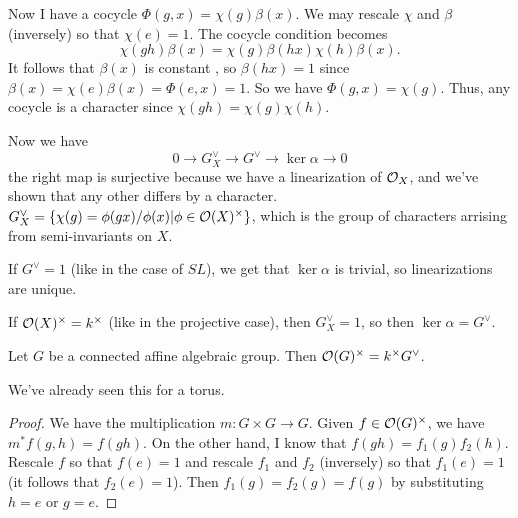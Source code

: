 Now I have a cocycle $\Phi(g,x)=\chi(g)\beta(x)$. We may rescale $\chi$ and $\beta$ (inversely) so that $\chi(e)=1$. The cocycle condition becomes
\[
 \chi(gh)\beta(x)=\chi(g)\beta(hx)\chi(h)\beta(x).
\]
It follows that $\beta(x)$ is constant , so $\beta(hx)=1$ since $\beta(x)=\chi(e)\beta(x)=\Phi(e,x)=1$. So we have $\Phi(g,x)=\chi(g)$. Thus, any cocycle is a character since $\chi(gh)=\chi(g)\chi(h)$.

Now we have
\[
 0\to G_X^\vee\to G^\vee\to \ker \alpha \to 0
\]
the right map is surjective because we have a linearization of $\mathcal{O}_X$, and we've shown that any other differs by a character. $G_X^\vee = \{\chi(g) = \phi(gx)/\phi(x)|\phi\in \mathcal{O}(X)^\times\}$, which is the group of characters arrising from semi-invariants on $X$.
\begin{example}
 If $G^\vee =1$ (like in the case of $SL$), we get that $\ker \alpha$ is trivial, so linearizations are unique.
 
 If $\mathcal{O}(X)^\times =k^\times$ (like in the projective case), then $G_X^\vee=1$, so then $\ker \alpha=G^\vee$.
\end{example}
\begin{theorem}
 Let $G$ be a connected affine algebraic group. Then $\mathcal{O}(G)^\times = k^\times G^\vee$.
\end{theorem}
We've already seen this for a torus.
\begin{proof}
 We have the multiplication $m\colon G\times G\to G$. Given $f\in \mathcal{O}(G)^\times$, we have $m^* f(g,h)=f(gh)$. On the other hand, I know that $f(gh)=f_1(g)f_2(h)$. Rescale $f$ so that $f(e)=1$ and rescale $f_1$ and $f_2$ (inversely) so that $f_1(e)=1$ (it follows that $f_2(e)=1$). Then $f_1(g)=f_2(g)=f(g)$ by substituting $h=e$ or $g=e$.
\end{proof}

